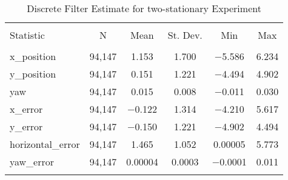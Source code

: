 
\begin{table}[h] \centering 
  \caption{Discrete Filter Estimate for two-stationary Experiment} 
  \label{tab:two_stationary_discrete_summary} 
\begin{tabular}{@{\extracolsep{5pt}}lccccc} 
\\[-1.8ex]\hline 
\hline \\[-1.8ex] 
Statistic & \multicolumn{1}{c}{N} & \multicolumn{1}{c}{Mean} & \multicolumn{1}{c}{St. Dev.} & \multicolumn{1}{c}{Min} & \multicolumn{1}{c}{Max} \\ 
\hline \\[-1.8ex] 
x\_position & 94,147 & 1.153 & 1.700 & $-$5.586 & 6.234 \\ 
y\_position & 94,147 & 0.151 & 1.221 & $-$4.494 & 4.902 \\ 
yaw & 94,147 & 0.015 & 0.008 & $-$0.011 & 0.030 \\ 
x\_error & 94,147 & $-$0.122 & 1.314 & $-$4.210 & 5.617 \\ 
y\_error & 94,147 & $-$0.150 & 1.221 & $-$4.902 & 4.494 \\ 
horizontal\_error & 94,147 & 1.465 & 1.052 & 0.00005 & 5.773 \\ 
yaw\_error & 94,147 & 0.00004 & 0.0003 & $-$0.0001 & 0.011 \\ 
\hline \\[-1.8ex] 
\end{tabular} 
\end{table} 
